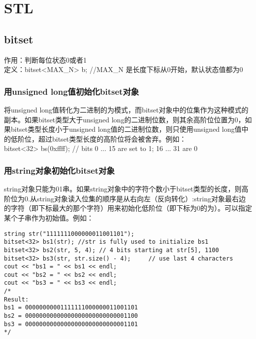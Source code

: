 %
%

\chapter{STL}

\section{bitset}

作用：判断每位状态0或者1 \\
定义：bitset<MAX\_N> b; //MAX\_N 是长度下标从0开始，默认状态值都为0 \\

\subsection{用unsigned long值初始化bitset对象}

将unsigned long值转化为二进制的为模式，而bitset对象中的位集作为这种模式的副本。如果bitset类型大于unsigned long的二进制位数，则其余高阶位位置为0，如果bitset类型长度小于unsigned long值的二进制位数，则只使用unsigned long值中的低阶位，超过bitset类型长度的高阶位将会被舍弃。例如：\\
bitset<32> bs(0xffff);          // bits 0 ... 15 are set to 1; 16 ... 31 are 0

\subsection{用string对象初始化bitset对象}

string对象只能为01串。如果string对象中的字符个数小于bitset类型的长度，则高阶位为0.从string对象读入位集的顺序是从右向左（反向转化）:string对象最右边的字符（即下标最大的那个字符）用来初始化低阶位（即下标为0的为）。可以指定某个子串作为初始值。例如：
\begin{lstlisting}
string str("1111111000000011001101");
bitset<32> bs1(str); //str is fully used to initialize bs1
bitset<32> bs2(str, 5, 4); // 4 bits starting at str[5], 1100
bitset<32> bs3(str, str.size() - 4);     // use last 4 characters
cout << "bs1 = " << bs1 << endl;
cout << "bs2 = " << bs2 << endl;
cout << "bs3 = " << bs3 << endl;
/*
Result:
bs1 = 00000000001111111000000011001101
bs2 = 00000000000000000000000000001100
bs3 = 00000000000000000000000000001101
*/
\end{lstlisting}
